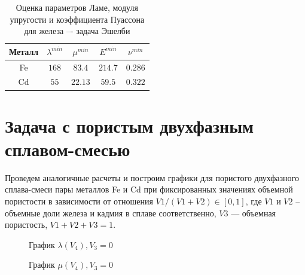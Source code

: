 \documentclass[12pt,a4paper]{article}
\begin{document}
\pagebreak

\begin{table}[h!]
    \centering
    \begin{tabular}{|c|c|c|c|c|}
        \hline 
        Металл & $ \lambda^{min}$ & $\mu^{min}$ & $E^{min}$ & $\nu^{min}$ \\
        \hline 
        Fe & $168$ & $83.4$ & $214.7$ & $0.286$ \\
        \hline
        Cd & $55$ & $22.13$ & $59.5$ & $0.322$ \\
        \hline 
    \end{tabular}
    \vspace{3mm}
    \caption{Оценка параметров Ламе, модуля упругости и коэффициента Пуассона для железа –- задача Эшелби}
 \end{table}

 \section{Задача с пористым двухфазным сплавом-смесью}

 Проведем аналогичные расчеты и построим графики для пористого двухфазного сплава-смеси пары металлов Fe и Cd при фиксированных значениях объемной пористости в зависимости от отношения $V1/(V1 + V2) \in [0, 1]$, где $V1$ и $V2$ -- объемные доли железа и кадмия в сплаве соответственно, $V3$ — объемная пористость, $V1 + V2 + V3 = 1$.

    \begin{figure}[h]
        \caption{График $\lambda(V_4), V_3 = 0$}
    \end{figure}

    \pagebreak

    \begin{figure}[h]
        \caption{График $\mu(V_4), V_3 = 0$}
    \end{figure}
\end{document}
